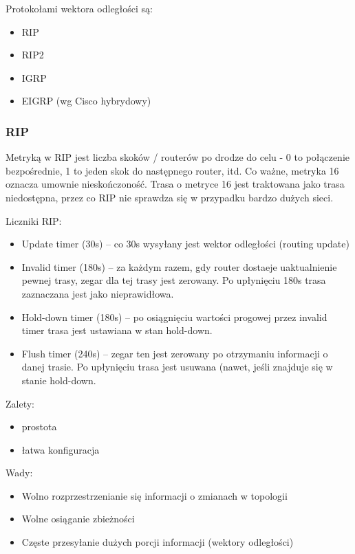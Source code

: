 \documentclass[main.tex]{subfiles}
\begin{document}
    Protokołami wektora odległości są:
    \begin{itemize}
        \item RIP
        \item RIP2
        \item IGRP
        \item EIGRP (wg Cisco hybrydowy)
    \end{itemize}

    \subsubsection{RIP}
    Metryką w RIP jest liczba skoków / routerów po drodze do celu - 0 to połączenie bezpośrednie, 1 to jeden skok do następnego router, itd. Co ważne, metryka 16
    oznacza umownie nieskończoność. Trasa o metryce 16 jest traktowana jako trasa niedostępna, przez co RIP nie sprawdza się w przypadku bardzo dużych sieci.

    Liczniki RIP:
    \begin{itemize}
        \item Update timer (30s) – co 30s wysyłany jest wektor odległości (routing update)
        \item Invalid timer (180s) – za każdym razem, gdy router dostaeje uaktualnienie pewnej trasy, zegar dla tej trasy jest zerowany. Po upłynięciu 180s trasa zaznaczana jest jako nieprawidłowa.
        \item Hold-down timer (180s) – po osiągnięciu wartości progowej przez invalid timer trasa jest ustawiana w stan hold-down.
        \item Flush timer (240s) – zegar ten jest zerowany po otrzymaniu informacji o danej trasie. Po upłynięciu trasa jest usuwana (nawet, jeśli znajduje się w stanie hold-down.
    \end{itemize}

    Zalety:
    \begin{itemize}
        \item prostota
        \item łatwa konfiguracja
    \end{itemize}

    Wady:
    \begin{itemize}
        \item Wolno rozprzestrzenianie się informacji o zmianach w topologii
        \item Wolne osiąganie zbieżności
        \item Częste przesyłanie dużych porcji informacji (wektory odległości)
    \end{itemize}
\end{document}

